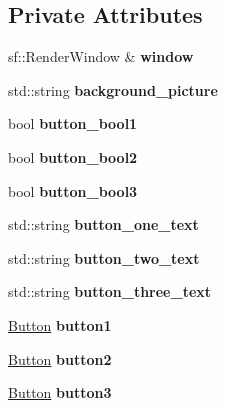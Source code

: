 \subsection*{Private Attributes}
\begin{DoxyCompactItemize}
\item 
\mbox{\label{classmenu_a27f2df7cf63febffe1c3c5a5e13ffb8d}} 
sf\+::\+Render\+Window \& {\bfseries window}
\item 
\mbox{\label{classmenu_af403beeeb7beef5621f0ea806c9f3e6e}} 
std\+::string {\bfseries background\+\_\+picture}
\item 
\mbox{\label{classmenu_a044c86b2b6cd959a53f4e92caf34f7a0}} 
bool {\bfseries button\+\_\+bool1}
\item 
\mbox{\label{classmenu_a043c728ce292a4d87e5e59c9c3db13b9}} 
bool {\bfseries button\+\_\+bool2}
\item 
\mbox{\label{classmenu_a469661400ee077af1b949bac629d30c7}} 
bool {\bfseries button\+\_\+bool3}
\item 
\mbox{\label{classmenu_a460e3d024e939e6469aede94fd86a64c}} 
std\+::string {\bfseries button\+\_\+one\+\_\+text}
\item 
\mbox{\label{classmenu_a027f3482fde6a4991ff4036e9e0472bd}} 
std\+::string {\bfseries button\+\_\+two\+\_\+text}
\item 
\mbox{\label{classmenu_ac785c6419d139d0181e0487805657e32}} 
std\+::string {\bfseries button\+\_\+three\+\_\+text}
\item 
\mbox{\label{classmenu_a0e51e3f8ef8fd769a42ca9a1ab3ed53e}} 
\hyperlink{class_button}{Button} {\bfseries button1}
\item 
\mbox{\label{classmenu_a3292e41431ba6f6f9a1b08b94206a076}} 
\hyperlink{class_button}{Button} {\bfseries button2}
\item 
\mbox{\label{classmenu_a4f19c398a6009b9d17e197c51ad19a66}} 
\hyperlink{class_button}{Button} {\bfseries button3}
\end{DoxyCompactItemize}


